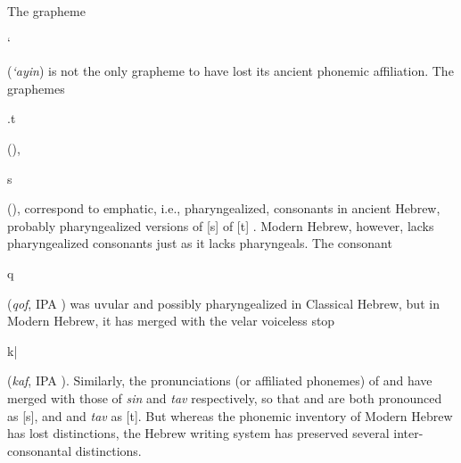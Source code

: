 The grapheme \begin{cjhebrew}`\end{cjhebrew} (\textit{`ayin}) is not the only 
grapheme to have 
lost its ancient phonemic affiliation. 
The graphemes \begin{cjhebrew}.t\end{cjhebrew} 
(\textit{}), \begin{cjhebrew}s\end{cjhebrew} 
(\textit{}), correspond to emphatic, i.e., 
pharyngealized, consonants in ancient 
Hebrew, probably pharyngealized versions of [s] of [t] \citep{matras-and-schiff:2005}.
Modern Hebrew, however, lacks pharyngealized consonants just as 
it lacks pharyngeals. 
The consonant \begin{cjhebrew}q\end{cjhebrew} (\textit{qof}, 
IPA \textipa{[q]}) was uvular and 
possibly pharyngealized in Classical Hebrew, but in Modern Hebrew, 
it has merged with the velar voiceless stop
\begin{cjhebrew}k|\end{cjhebrew} (\textit{kaf}, IPA \textipa{[k]}).
Similarly, the pronunciations (or affiliated phonemes) of 
\textit{} and \textit{} 
have merged with those of \textit{sin} and \textit{tav} respectively, 
 so that \textit{} and \textit{} 
 are both pronounced as [s], and \textit{} and 
 \textit{tav} as [t]. But whereas the phonemic inventory of 
 Modern Hebrew has lost distinctions, the Hebrew writing system has preserved several inter-consonantal distinctions.

